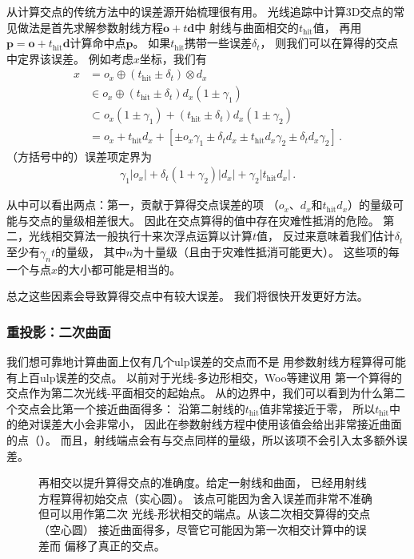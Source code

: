 从计算交点的传统方法中的误差源开始梳理很有用。
光线追踪中计算3D交点的常见做法是首先求解参数射线方程$\bm o+t\bm d$中
射线与曲面相交的$t_{\text{hit}}$值，
再用$\bm p=\bm o+t_{\text{hit}}\bm d$计算命中点$\bm p$。
如果$t_{\text{hit}}$携带一些误差$\delta_t$，
则我们可以在算得的交点中定界该误差。
例如考虑$x$坐标，我们有
\begin{align*}
    x & =o_x\oplus(t_{\text{hit}}\pm\delta_t)\otimes d_x                                                              \\
      & \in o_x\oplus(t_{\text{hit}}\pm\delta_t)d_x(1\pm\gamma_1)                                                     \\
      & \subset o_x(1\pm\gamma_1)+(t_{\text{hit}}\pm\delta_t)d_x(1\pm\gamma_2)                                        \\
      & =o_x+t_{\text{hit}}d_x+[\pm o_x\gamma_1\pm\delta_td_x\pm t_{\text{hit}}d_x\gamma_2\pm\delta_td_x\gamma_2]\, .
\end{align*}
（方括号中的）误差项定界为
\begin{align}\label{eq:3.13}
    \gamma_1|o_x|+\delta_t(1+\gamma_2)|d_x|+\gamma_2|t_{\text{hit}}d_x|\, .
\end{align}

从中可以看出两点：第一，贡献于算得交点误差的项
（$o_x$、$d_x$和$t_{\text{hit}}d_x$）的量级可能与交点的量级相差很大。
因此在交点算得的值中存在灾难性抵消的危险。
第二，光线相交算法一般执行十来次浮点运算以计算$t$值，
反过来意味着我们估计$\delta_t$至少有$\gamma_nt$的量级，
其中$n$为十量级（且由于灾难性抵消可能更大）。
这些项的每一个与点$x$的大小都可能是相当的。

总之这些因素会导致算得交点中有较大误差。
我们将很快开发更好方法。

\subsubsection*{重投影：二次曲面}
我们想可靠地计算曲面上仅有几个ulp误差的交点而不是
用参数射线方程算得可能有上百ulp误差的交点。
以前对于光线-多边形相交，Woo等\parencite*{536271}建议用
第一个算得的交点作为第二次光线-平面相交的起始点。
从的边界中，我们可以看到为什么第二个交点会比第一个接近曲面得多：
沿第二射线的$t_{\text{hit}}$值非常接近于零，
所以$t_{\text{hit}}$中的绝对误差大小会非常小，
因此在参数射线方程中使用该值会给出非常接近曲面的点（）。
而且，射线端点会有与交点同样的量级，所以该项不会引入太多额外误差。
\begin{figure}[htbp]
    \centering
    \caption{再相交以提升算得交点的准确度。给定一射线和曲面，
        已经用射线方程算得初始交点（实心圆）。
        该点可能因为舍入误差而非常不准确但可以用作第二次
        光线-形状相交的端点。从该二次相交算得的交点（空心圆）
        接近曲面得多，尽管它可能因为第一次相交计算中的误差而
        偏移了真正的交点。}
    \label{fig:3.44}
\end{figure}

